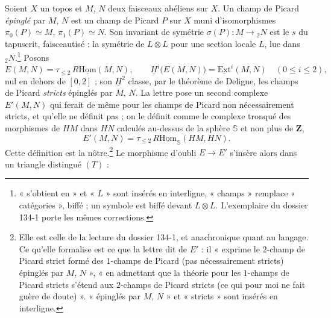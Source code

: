 \documentclass[11pt,a4paper]{article}
\begin{document}
Soient $X$ un topos et $M$, $N$ deux faisceaux abéliens sur $X$. Un champ de
Picard \emph{épinglé} par $M$, $N$ est un champ de Picard $P$ sur $X$ muni
d'isomorphismes $\pi_0(P) \simeq M$, $\pi_1(P) \simeq N$. Son invariant de
symétrie $\sigma(P) : M \to {}_2N$ est le $s$ du tapuscrit, faisceautisé :
la symétrie de $L \otimes L$ pour une section locale $L$, lue dans
${}_2N$.\footnote{« s'obtient en » et « $L$ » sont insérés en interligne,
« champs » remplace « catégories », biffé ; un symbole est biffé devant
$L \otimes L$. L'exemplaire du dossier 134-1 porte les mêmes corrections.}
Posons
\[ E(M,N) = \tau_{\leq 2}\, R\underline{\mathrm{Hom}}(M,N), \qquad
   \underline{H}^i\bigl(E(M,N)\bigr) = \underline{\mathrm{Ext}}^i(M,N)
   \quad (0 \leq i \leq 2), \]
nul en dehors de $[0,2]$ ; son $\underline{H}^2$ classe, par le théorème de
Deligne, les champs de Picard \emph{stricts} épinglés par $M$, $N$. La lettre
pose un second complexe $E'(M,N)$ qui ferait de même pour les champs de
Picard non nécessairement stricts, et qu'elle ne définit pas ; on le
définit comme le complexe tronqué des morphismes de $HM$ dans $HN$ calculés
au-dessus de la sphère $\mathbb{S}$ et non plus de $\mathbf{Z}$,
\[ E'(M,N) = \tau_{\leq 2}\, R\underline{\mathrm{Hom}}_{\mathbb{S}}(HM, HN) .
\]
Cette définition est la nôtre.\footnote{Elle est celle de la lecture du
dossier 134-1, et anachronique quant au langage. Ce qu'elle formalise est ce
que la lettre dit de $E'$ : il « exprime le $2$-champ de Picard strict formé
des $1$-champs de Picard (pas nécessairement stricts) épinglés par $M$,
$N$ », « en admettant que la théorie pour les $1$-champs de Picard stricts
s'étend aux $2$-champs de Picard stricts (ce qui pour moi ne fait guère de
doute) ». « épinglés par $M$, $N$ » et « stricts » sont insérés en
interligne.} Le morphisme d'oubli $E \to E'$ s'insère alors dans un triangle
distingué $(T)$ :

\end{document}
